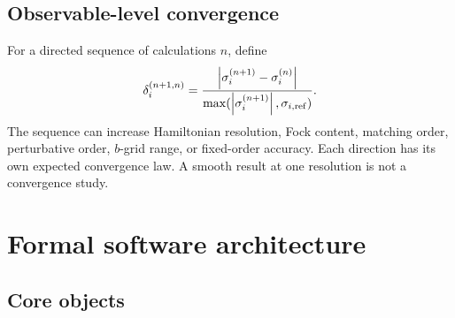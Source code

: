 \documentclass[11pt]{article}
\newcommand{\abs}[1]{\left|#1\right|}
\begin{document}
\subsection{Observable-level convergence}

For a directed sequence of calculations \(n\), define
\begin{equation}
 \delta_i^{(n+1,n)}
 =
 \frac{
 \abs{\sigma_i^{(n+1)}-\sigma_i^{(n)}}
 }{
 \max(\abs{\sigma_i^{(n+1)}},\sigma_{i,\rm ref})
 }.
 \label{eq:observable-convergence}
\end{equation}
The sequence can increase Hamiltonian resolution, Fock content, matching order,
perturbative order, \(b\)-grid range, or fixed-order accuracy.  Each direction
has its own expected convergence law.  A smooth result at one resolution is
not a convergence study.

\section{Formal software architecture}
\label{sec:software}

\subsection{Core objects}
\end{document}
